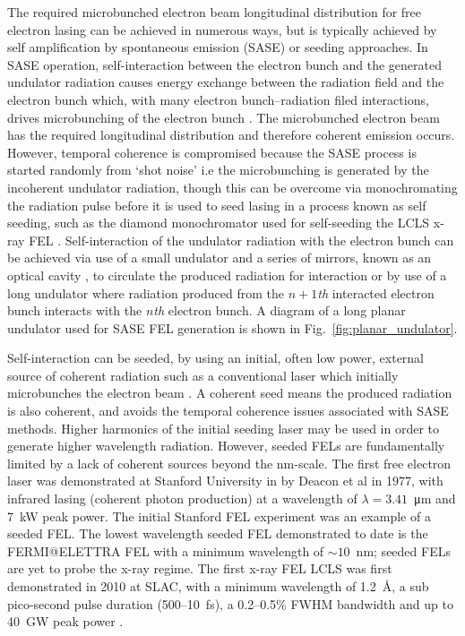 \documentclass[../main.tex]{subfiles}
\begin{document}
The required microbunched electron beam longitudinal distribution for free electron lasing can be achieved in numerous ways, but is typically achieved by self amplification by spontaneous emission (SASE) or seeding approaches. In SASE operation, self-interaction between the electron bunch and the generated undulator radiation causes energy exchange between the radiation field and the electron bunch which, with many electron bunch--radiation filed interactions, drives microbunching of the electron bunch \cite{kondratenko1980generating,bonifacio1984collective}. The microbunched electron beam has the required longitudinal distribution and therefore coherent emission occurs. However, temporal coherence is compromised because the SASE process is started randomly from `shot noise' i.e the microbunching is generated by the incoherent undulator radiation, though this can be overcome via monochromating the radiation pulse before it is used to seed lasing in a process known as self seeding, such as the diamond monochromator used for self-seeding the LCLS x-ray FEL \cite{emma2010first
}. Self-interaction of the undulator radiation with the electron bunch can be achieved via use of a small undulator and a series of mirrors, known as an optical cavity \cite{petrillo2012photon}, to circulate the produced radiation for interaction or by use of a long undulator where radiation produced from the $n+1$\textit{th} interacted electron bunch interacts with the $n$\textit{th} electron bunch. A diagram of a long planar undulator used for SASE FEL generation is shown in Fig.~\ref{fig:planar_undulator}. %

Self-interaction can be seeded, by using an initial, often low power, external source of coherent radiation such as a conventional laser which initially microbunches the electron beam \cite{allaria2012highly}. A coherent seed means the produced radiation is also coherent, and avoids the temporal coherence issues associated with SASE methods. Higher harmonics of the initial seeding laser may be used in order to generate higher wavelength radiation. However, seeded FELs are fundamentally limited by a lack of coherent sources beyond the \si{\nano\meter}-scale. The first free electron laser was demonstrated at Stanford University in by Deacon et al \cite{deacon1977first} in 1977, with infrared lasing (coherent photon production) at a wavelength of $\lambda = 3.41$~\si{\micro\meter} and 7~\si{\kilo\watt} peak power. The initial Stanford FEL experiment was an example of a seeded FEL. The lowest wavelength seeded FEL demonstrated to date is the FERMI@ELETTRA FEL \cite{allaria2012highly} with a minimum wavelength of $\sim10$~\si{\nano\meter}; seeded FELs are yet to probe the x-ray regime. The first x-ray FEL LCLS was first demonstrated in 2010 at SLAC, with a minimum wavelength of 1.2~\si{\angstrom}, a sub pico-second pulse duration (500--10~\si{\femto\second}), a 0.2--0.5\% FWHM bandwidth and up to 40~\si{\giga\watt} peak power \cite{emma2010first}.
\end{document}
